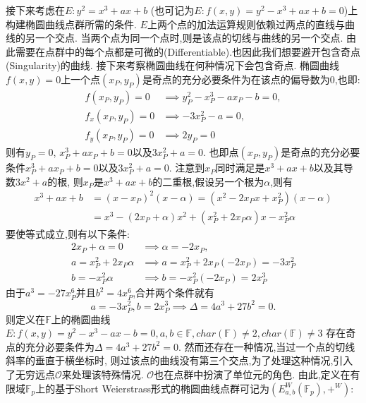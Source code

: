 \documentclass{article}
\newcommand{\F}{\mathbb{F}}
\begin{document}
接下来考虑在$E:  y^2 = x^3 + ax + b$ (也可记为$E: f(x,y) = y^2 - x^3 + ax + b = 0$)上构建椭圆曲线点群所需的条件.
$E$上两个点的加法运算规则依赖过两点的直线与曲线的另一个交点.
当两个点为同一个点时,则是该点的切线与曲线的另一个交点.
由此需要在点群中的每个点都是可微的(Diﬀerentiable).也因此我们想要避开包含奇点(Singularity)的曲线.
接下来考察椭圆曲线在何种情况下会包含奇点.
椭圆曲线$f(x,y) = 0$上一个点$(x_P,y_P)$是奇点的充分必要条件为在该点的偏导数为0,也即:
\begin{equation*}
\begin{split}
f(x_P, y_P) = 0 & \implies y_P^2 - x_P^3 - ax_P - b = 0, \\
 f_x(x_P, y_P) = 0 & \implies  -3x_P^2 - a = 0, \\
 f_y(x_P, y_P) = 0 & \implies 2y_P  = 0
\end{split}
\end{equation*}
则有$y_P = 0$, $x_P^3 + ax_P + b = 0$以及$3x_P^2 + a = 0$.
也即点$(x_P,y_P)$是奇点的充分必要条件$x_P^3 + ax_P + b = 0$以及$3x_P^2 + a = 0$.
注意到$x_P$同时满足是$x^3 + ax + b$以及其导数$3x^2 + a$的根,
则$x_P$是$x^3 + ax + b$的二重根,假设另一个根为$\alpha$,则有
\begin{equation*}
\begin{split}
x^3 + ax + b & = (x-x_P)^2(x-\alpha) = (x^2 -2x_Px + x_P^2)(x-\alpha)\\
 & = x^3 - (2x_P + \alpha)x^2 + (x_P^2 + 2x_P\alpha)x - x_P^2\alpha
\end{split}
\end{equation*}
要使等式成立,则有以下条件:
\begin{equation*}
\begin{split}
2x_P + \alpha = 0 & \implies \alpha = -2x_P, \\
a = x_P^2 + 2x_P\alpha & \implies a = x_P^2 + 2x_P(-2x_P) = -3x_P^2\\
b = - x_P^2\alpha & \implies b = -x_P^2(-2x_P) = 2x_P^3
\end{split}
\end{equation*}
由于$a^3 = -27x_P^6$并且$b^2 = 4x_P^6$,合并两个条件就有
$$
a  = -3x_P^2, b = 2x_P^3 \implies  \Delta = 4a^3 + 27b^2 = 0.
$$
则定义在$\F$上的椭圆曲线$E: f(x,y) = y^2 - x^3 - ax - b = 0, a, b \in \F, char(\F)\neq 2, char(\F)\neq 3$
存在奇点的充分必要条件为$\Delta = 4a^3 + 27b^2 = 0$.
然而还存在一种情况,当过一个点的切线斜率的垂直于横坐标时,
则过该点的曲线没有第三个交点,为了处理这种情况,引入了无穷远点$\mathcal{O}$来处理该特殊情况.
$\mathcal{O}$也在点群中扮演了单位元的角色.
由此,定义在有限域$\F_p$上的基于Short Weierstrass形式的椭圆曲线点群可记为$(E_{a,b}^{W}(\F_p), +^W)$:
\end{document}
